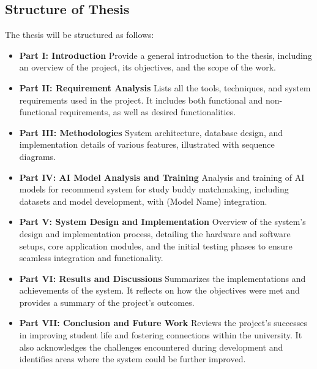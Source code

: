 \documentclass{article}
\begin{document}
\subsection{Structure of Thesis}
The thesis will be structured as follows:
\begin{itemize}
    \item \textbf{Part I: Introduction }
    \newline
    Provide a general introduction to the thesis, including an overview of the project, its objectives, and the scope of the work.
    \item \textbf{Part II: Requirement Analysis }
    \newline
    Lists all the tools, techniques, and system requirements used in the project. It includes
    both functional and non-functional requirements, as well as desired functionalities.
    \item \textbf{Part III: Methodologies }
    \newline
    System architecture, database design, and implementation details of various features, illustrated with sequence diagrams.
    \item \textbf{Part IV: AI Model Analysis and Training }
    \newline
    Analysis and training of AI models for recommend system for study buddy matchmaking, including datasets and model development, with (Model Name) integration.
    \item \textbf{Part V: System Design and Implementation }
    \newline
    Overview of the system's design and implementation process, detailing the hardware and software setups, core application modules, and the initial testing phases to ensure seamless integration and functionality.
    \item \textbf{Part VI: Results and Discussions }
    \newline 
    Summarizes the implementations and achievements of the system. It reflects on how the
    objectives were met and provides a summary of the project's outcomes.
    \item \textbf{Part VII: Conclusion and Future Work }
    \newline
    Reviews the project's successes in improving student life and fostering connections within the university.
    It also acknowledges the challenges encountered during development and identifies areas where the system could be further improved.
\end{itemize}
\end{document}
